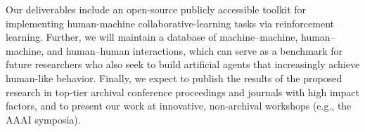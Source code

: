 Our deliverables include an open-source publicly accessible toolkit
for implementing human-machine collaborative-learning tasks via
reinforcement learning. Further, we will maintain a database of
machine--machine, human--machine, and human--human interactions, which can serve as a benchmark for future
researchers who also seek to build artificial agents that increasingly
achieve human-like behavior.
%
Finally, we expect to publish the results of the proposed research in
top-tier archival conference proceedings and journals with high
impact factors, and to present our work at innovative, non-archival
workshops (e.g., the AAAI symposia).

